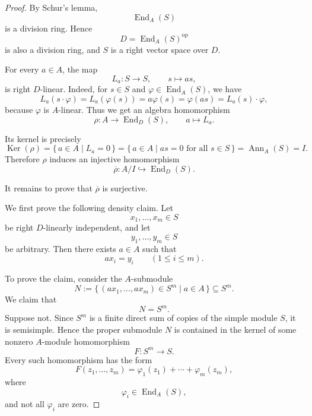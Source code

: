 \begin{proof}
    By Schur's lemma,
    \[
        \operatorname{End}_A(S)
    \]
    is a division ring. Hence
    \[
        D=\operatorname{End}_A(S)^{\operatorname{op}}
    \]
    is also a division ring, and \(S\) is a right vector space over \(D\).

    For every \(a\in A\), the map
    \[
        L_a:S\longrightarrow S,\qquad s\longmapsto as,
    \]
    is right \(D\)-linear. Indeed, for \(s\in S\) and
    \(\varphi\in \operatorname{End}_A(S)\), we have
    \[
        L_a(s\cdot \varphi)
        =
        L_a(\varphi(s))
        =
        a\varphi(s)
        =
        \varphi(as)
        =
        L_a(s)\cdot \varphi,
    \]
    because \(\varphi\) is \(A\)-linear. Thus we get an algebra homomorphism
    \[
        \rho:A\longrightarrow \operatorname{End}_D(S),
        \qquad
        a\longmapsto L_a.
    \]

    Its kernel is precisely
    \[
        \operatorname{Ker}(\rho)
        =
        \{\,a\in A\mid L_a=0\,\}
        =
        \{\,a\in A\mid as=0\text{ for all }s\in S\,\}
        =
        \operatorname{Ann}_A(S)
        =
        I.
    \]
    Therefore \(\rho\) induces an injective homomorphism
    \[
        \overline{\rho}:A/I\hookrightarrow \operatorname{End}_D(S).
    \]

    It remains to prove that \(\overline{\rho}\) is surjective.

    We first prove the following density claim. Let
    \[
        x_1,\dots,x_m\in S
    \]
    be right \(D\)-linearly independent, and let
    \[
        y_1,\dots,y_m\in S
    \]
    be arbitrary. Then there exists \(a\in A\) such that
    \[
        ax_i=y_i
        \qquad
        (1\leq i\leq m).
    \]

    To prove the claim, consider the \(A\)-submodule
    \[
        N
        :=
        \{\, (ax_1,\dots,ax_m)\in S^m\mid a\in A\,\}
        \subseteq S^m.
    \]
    We claim that
    \[
        N=S^m.
    \]
    Suppose not. Since \(S^m\) is a finite direct sum of copies of the simple
    module \(S\), it is semisimple. Hence the proper submodule \(N\) is contained
    in the kernel of some nonzero \(A\)-module homomorphism
    \[
        F:S^m\longrightarrow S.
    \]
    Every such homomorphism has the form
    \[
        F(z_1,\dots,z_m)
        =
        \varphi_1(z_1)+\cdots+\varphi_m(z_m),
    \]
    where
    \[
        \varphi_i\in \operatorname{End}_A(S),
    \]
    and not all \(\varphi_i\) are zero.


\end{proof}

